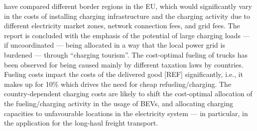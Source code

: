 \documentclass[preprint,10pt,review, authoryear]{elsarticle}
\begin{document}
        \citet{hildermeier2024power} have compared different border regions in the EU, which would significantly vary in the costs of installing charging infrastructure and the charging activity due to different electricity market zones, network connection fees, and grid fees. The report is concluded with the emphasis of the potential of large charging loads --- if uncoordinated --- being allocated in a way that the local power grid is burdened  --- through ``charging tourism''. The cost-optimal fueling of trucks has been observed for \citep{bmik2021mobility} being caused mainly by different taxation laws by countries. Fueling costs impact the costs of the delivered good [REF] significantly, i.e., it makes up for 10\% which drives the need for cheap refueling/charging. The country-dependent charging costs \citep{Lanz2022} are likely to shift the cost-optimal allocation of the fueling/charging activity in the usage of BEVs, and allocating charging capacities to unfavourable locations in the electricity system --- in particular, in the application for the long-haul freight transport. 
        
    
\end{document}
